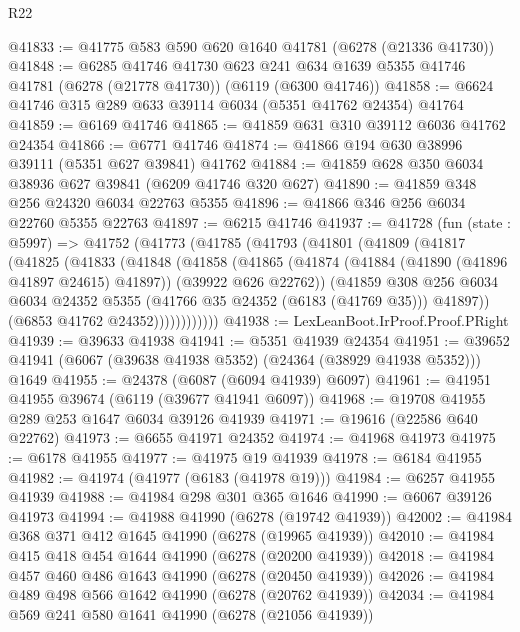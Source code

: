 \begin{lexlean}{R22}
\begin{coremodule}
@41833 := @41775 @583 @590 @620 @1640 @41781 (@6278 (@21336 @41730))
@41848 := @6285
    @41746
    @41730
    @623
    @241
    @634
    @1639
    @5355
    @41746
    @41781
    (@6278 (@21778 @41730))
    (@6119 (@6300 @41746))
@41858 := @6624 @41746 @315 @289 @633 @39114 @6034 (@5351 @41762 @24354) @41764
@41859 := @6169 @41746
@41865 := @41859 @631 @310 @39112 @6036 @41762 @24354
@41866 := @6771 @41746
@41874 := @41866 @194 @630 @38996 @39111 (@5351 @627 @39841) @41762
@41884 := @41859 @628 @350 @6034 @38936 @627 @39841 (@6209 @41746 @320 @627)
@41890 := @41859 @348 @256 @24320 @6034 @22763 @5355
@41896 := @41866 @346 @256 @6034 @22760 @5355 @22763
@41897 := @6215 @41746
@41937 := @41728
    (fun (state : @5997) =>
    @41752
      (@41773
        (@41785
          (@41793
            (@41801
              (@41809
                (@41817
                  (@41825
                    (@41833
                      (@41848
                        (@41858
                          (@41865
                            (@41874
                              (@41884 (@41890 (@41896 @41897 @24615) @41897))
                              (@39922 @626 @22762))
                            (@41859
                              @308
                              @256
                              @6034
                              @6034
                              @24352
                              @5355
                              (@41766 @35 @24352 (@6183 (@41769 @35)))
                              @41897))
                          (@6853 @41762 @24352))))))))))))
@41938 := LexLeanBoot.IrProof.Proof.PRight
@41939 := @39633 @41938
@41941 := @5351 @41939 @24354
@41951 := @39652 @41941 (@6067 (@39638 @41938 @5352) (@24364 (@38929 @41938 @5352))) @1649
@41955 := @24378 (@6087 (@6094 @41939) @6097)
@41961 := @41951 @41955 @39674 (@6119 (@39677 @41941 @6097))
@41968 := @19708 @41955 @289 @253 @1647 @6034 @39126 @41939
@41971 := @19616 (@22586 @640 @22762)
@41973 := @6655 @41971 @24352
@41974 := @41968 @41973
@41975 := @6178 @41955
@41977 := @41975 @19 @41939
@41978 := @6184 @41955
@41982 := @41974 (@41977 (@6183 (@41978 @19)))
@41984 := @6257 @41955 @41939
@41988 := @41984 @298 @301 @365 @1646
@41990 := @6067 @39126 @41973
@41994 := @41988 @41990 (@6278 (@19742 @41939))
@42002 := @41984 @368 @371 @412 @1645 @41990 (@6278 (@19965 @41939))
@42010 := @41984 @415 @418 @454 @1644 @41990 (@6278 (@20200 @41939))
@42018 := @41984 @457 @460 @486 @1643 @41990 (@6278 (@20450 @41939))
@42026 := @41984 @489 @498 @566 @1642 @41990 (@6278 (@20762 @41939))
@42034 := @41984 @569 @241 @580 @1641 @41990 (@6278 (@21056 @41939))

\end{coremodule}
\end{lexlean}
